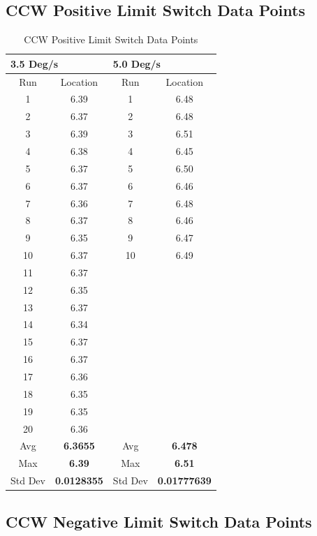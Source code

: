 \documentclass[SE,lsstdraft,authoryear,toc]{lsstdoc}
\begin{document}
\subsection{CCW Positive Limit Switch Data Points}
\begin{table}[h!]
  \begin{center}
    \caption{CCW Positive Limit Switch Data Points}
    \label{tab:table5}
    \begin{tabular}{c|c|c|c}
    \multicolumn{2}{l|}{\textbf{3.5 Deg/s}} & \multicolumn{2}{l|}{\textbf{5.0 Deg/s}}\\
    \midrule
    Run & Location & Run & Location \\
    1 & 6.39 & 1 & 6.48 \\
    2 & 6.37 & 2 & 6.48 \\
    3 & 6.39 & 3 & 6.51 \\
    4 & 6.38 & 4 & 6.45 \\
    5 & 6.37 & 5 & 6.50 \\
    6 & 6.37 & 6 & 6.46 \\
    7 & 6.36 & 7 & 6.48 \\
    8 & 6.37 & 8 & 6.46 \\
    9 & 6.35 & 9 & 6.47 \\
    10 & 6.37 & 10 & 6.49 \\
    11 & 6.37 & & \\
    12 & 6.35 & & \\
    13 & 6.37 & & \\
    14 & 6.34 & & \\
    15 & 6.37 & & \\
    16 & 6.37 & & \\
    17 & 6.36 & & \\
    18 & 6.35 & & \\
    19 & 6.35 & & \\
    20 & 6.36 & & \\
    Avg & \textbf{6.3655} & Avg & \textbf{6.478} \\
    Max & \textbf{6.39} & Max & \textbf{6.51} \\
    Std Dev & \textbf{0.0128355} & Std Dev & \textbf{0.01777639} \\
    \bottomrule
    \end{tabular}
  \end{center}
\end{table}
\subsection{CCW Negative Limit Switch Data Points}
\end{document}
